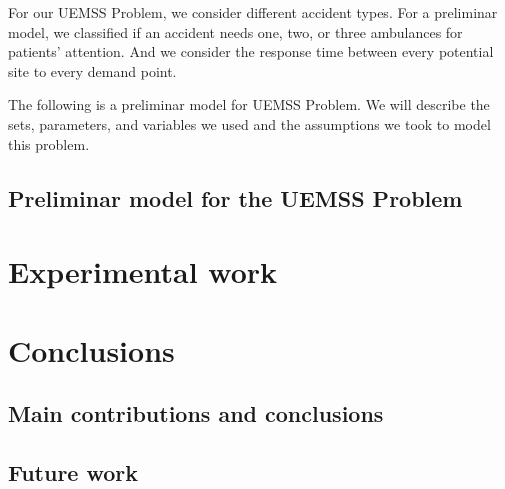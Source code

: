For our UEMSS Problem, we consider different accident types. For a preliminar model, we classified if an accident needs one, two, or three ambulances for patients' attention. And we consider the response time between every potential site to every demand point.

The following is a preliminar model for UEMSS Problem. We will describe the sets, parameters, and variables we used and the assumptions we took to model this problem.

\section{Preliminar model for the UEMSS Problem}


\chapter{Experimental work}\label{cap:exper}



\chapter{Conclusions}\label{cap:concl}



\section{Main contributions and conclusions}



\section{Future work}

